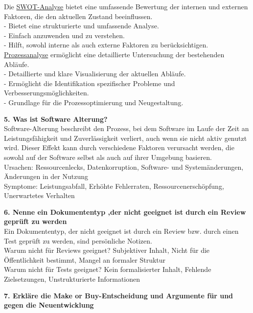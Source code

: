 \documentclass{article}
\begin{document}
Die \underline{SWOT-Analyse} bietet eine umfassende Bewertung der internen und externen Faktoren, die den aktuellen Zustand beeinflussen.\\
- Bietet eine strukturierte und umfassende Analyse.\\
- Einfach anzuwenden und zu verstehen. \\
- Hilft, sowohl interne als auch externe Faktoren zu berücksichtigen.\\
\underline{Prozessanalyse} ermöglicht eine detaillierte Untersuchung der bestehenden Abläufe. \\
- Detaillierte und klare Visualisierung der aktuellen Abläufe.\\
- Ermöglicht die Identifikation spezifischer Probleme und Verbesserungsmöglichkeiten.\\
- Grundlage für die Prozessoptimierung und Neugestaltung.\\
\textbf{5. Was ist Software Alterung?}\\
Software-Alterung beschreibt den Prozess, bei dem Software im Laufe der Zeit an Leistungsfähigkeit und Zuverlässigkeit verliert, auch wenn sie nicht aktiv genutzt wird. Dieser Effekt kann durch verschiedene Faktoren verursacht werden, die sowohl auf der Software selbst als auch auf ihrer Umgebung basieren. \\
Ursachen: Ressourcenlecks, Datenkorruption, Software- und Systemänderungen, Änderungen in der Nutzung\\
Symptome: Leistungsabfall, Erhöhte Fehlerraten, Ressourcenerschöpfung, Unerwartetes Verhalten\\
\textbf{6. Nenne ein Dokumententyp ,der nicht geeignet ist durch ein Review geprüft zu werden}\\
Ein Dokumententyp, der nicht geeignet ist durch ein Review bzw. durch einen Test geprüft zu werden, sind persönliche Notizen.\\
Warum nicht für Reviews geeignet? Subjektiver Inhalt, Nicht für die Öffentlichkeit bestimmt, Mangel an formaler Struktur\\
Warum nicht für Tests geeignet? Kein formalisierter Inhalt, Fehlende Zielsetzungen, Unstrukturierte Informationen\\
\textbf{7. Erkläre die Make or Buy-Entscheidung und Argumente für und gegen die Neuentwicklung}\\
\end{document}
